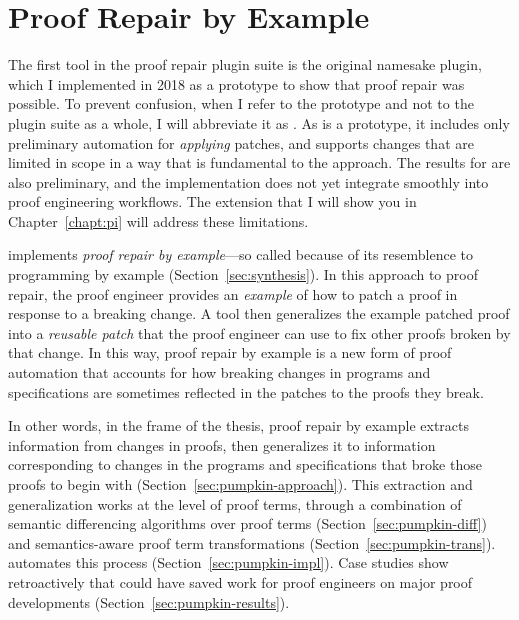 \chapter{Proof Repair by Example}
\label{ch:example}

The first tool in the \sysnamelong proof repair plugin suite is the original namesake \sysnamelong plugin, which I implemented in 2018 as a prototype to show that proof repair was possible.
To prevent confusion, when I refer to the \sysnamelong prototype and not to the plugin suite as a whole, I will abbreviate it as \sysname.
As \sysname is a prototype, it includes only preliminary automation for \textit{applying} patches,
and supports changes that are limited in scope in a way that is fundamental to the approach.
The results for \sysname are also preliminary, and the implementation does not yet integrate smoothly into proof engineering workflows.
The \toolnamec extension that I will show you in Chapter~\ref{chapt:pi} will address these limitations.

\sysname implements \textit{proof repair by example}---so called because of its resemblence to programming by example (Section~\ref{sec:synthesis}).
In this approach to proof repair, the proof engineer provides an \textit{example} of how to patch a proof in response to a breaking change.
A tool then generalizes the example patched proof into a \textit{reusable patch} that the proof engineer can use to fix other proofs broken by that change.
In this way, proof repair by example is a new form of proof automation that accounts for how 
breaking changes in programs and specifications are sometimes reflected in the patches to the proofs they break.

In other words, in the frame of the thesis, proof repair by example extracts information from changes in proofs,
then generalizes it to information corresponding to changes in the programs and specifications that broke those proofs to begin with (Section~\ref{sec:pumpkin-approach}).
This extraction and generalization works at the level of proof terms, through a combination of semantic differencing algorithms 
over proof terms (Section~\ref{sec:pumpkin-diff}) and 
semantics-aware proof term transformations (Section~\ref{sec:pumpkin-trans}).
\sysname automates this process (Section~\ref{sec:pumpkin-impl}).
Case studies show retroactively that \sysname could have saved work for proof engineers
on major proof developments (Section~\ref{sec:pumpkin-results}).















